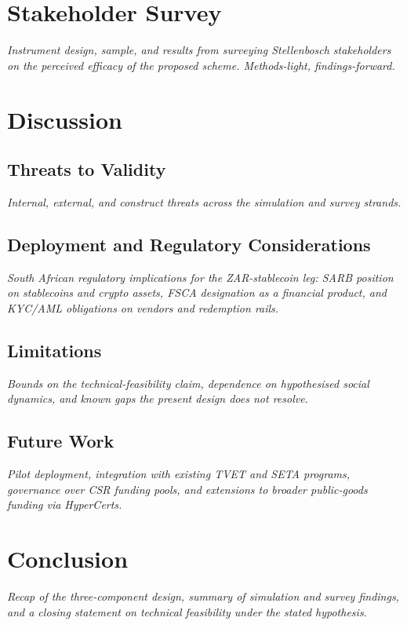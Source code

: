 \documentclass[conference]{IEEEtran}
\begin{document}
\section{Stakeholder Survey}
\textit{Instrument design, sample, and results from surveying Stellenbosch stakeholders on the perceived efficacy of the proposed scheme. Methods-light, findings-forward.}

\section{Discussion}

\subsection{Threats to Validity}
\textit{Internal, external, and construct threats across the simulation and survey strands.}

\subsection{Deployment and Regulatory Considerations}
\textit{South African regulatory implications for the ZAR-stablecoin leg: SARB position on stablecoins and crypto assets, FSCA designation as a financial product, and KYC/AML obligations on vendors and redemption rails.}

\subsection{Limitations}
\textit{Bounds on the technical-feasibility claim, dependence on hypothesised social dynamics, and known gaps the present design does not resolve.}

\subsection{Future Work}
\textit{Pilot deployment, integration with existing TVET and SETA programs, governance over CSR funding pools, and extensions to broader public-goods funding via HyperCerts.}

\section{Conclusion}
\textit{Recap of the three-component design, summary of simulation and survey findings, and a closing statement on technical feasibility under the stated hypothesis.}
\end{document}

